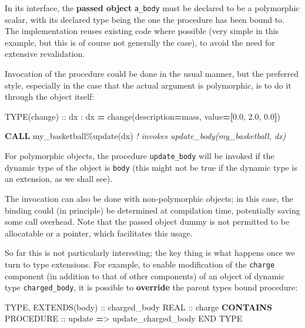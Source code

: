 \documentclass[
]{scrartcl}
\newenvironment{Shaded}{}{}
\newcommand{\CommentTok}[1]{\textcolor[rgb]{0.38,0.63,0.69}{\textit{#1}}}
\newcommand{\DataTypeTok}[1]{\textcolor[rgb]{0.56,0.13,0.00}{#1}}
\newcommand{\FloatTok}[1]{\textcolor[rgb]{0.25,0.63,0.44}{#1}}
\newcommand{\KeywordTok}[1]{\textcolor[rgb]{0.00,0.44,0.13}{\textbf{#1}}}
\newcommand{\NormalTok}[1]{#1}
\newcommand{\OperatorTok}[1]{\textcolor[rgb]{0.40,0.40,0.40}{#1}}
\newcommand{\StringTok}[1]{\textcolor[rgb]{0.25,0.44,0.63}{#1}}
\begin{document}
In its interface, the \textbf{passed object} \texttt{a\_body} must be
declared to be a polymorphic scalar, with its declared type being the
one the procedure has been bound to. The implementation reuses existing
code where possible (very simple in this example, but this is of course
not generally the case), to avoid the need for extensive revalidation.

Invocation of the procedure could be done in the usual manner, but the
preferred style, especially in the case that the actual argument is
polymorphic, is to do it through the object itself:

\begin{Shaded}
\begin{Highlighting}[]
\DataTypeTok{TYPE(change)} \DataTypeTok{::}\NormalTok{  dx}
\NormalTok{:}
\NormalTok{dx }\KeywordTok{=}\NormalTok{ change(description}\KeywordTok{=}\StringTok{\textquotesingle{}mass\textquotesingle{}}\NormalTok{, }\DataTypeTok{value}\KeywordTok{=[}\FloatTok{0.0}\NormalTok{, }\FloatTok{2.0}\NormalTok{, }\FloatTok{0.0}\KeywordTok{]}\NormalTok{)}

\KeywordTok{CALL}\NormalTok{ my\_basketball}\OperatorTok{\%}\NormalTok{update(dx) }\CommentTok{! invokes update\_body(my\_basketball, dx)}
\end{Highlighting}
\end{Shaded}

For polymorphic objects, the procedure \texttt{update\_body} will be
invoked if the dynamic type of the object is \texttt{body} (this might
not be true if the dynamic type is an extension, as we shall see).

The invocation can also be done with non-polymorphic objects; in this
case, the binding could (in principle) be determined at compilation
time, potentially saving some call overhead. Note that the passed object
dummy is not permitted to be allocatable or a pointer, which facilitates
this usage.

So far this is not particularly interesting; the key thing is what
happens once we turn to type extensions. For example, to enable
modification of the \texttt{charge} component (in addition to that of
other components) of an object of dynamic type \texttt{charged\_body},
it is possible to \textbf{override} the parent type\textquotesingle s
bound procedure:

\begin{Shaded}
\begin{Highlighting}[]
\DataTypeTok{TYPE}\NormalTok{, }\DataTypeTok{EXTENDS(body)} \DataTypeTok{::}\NormalTok{ charged\_body}
   \DataTypeTok{REAL} \DataTypeTok{::}\NormalTok{ charge}
\KeywordTok{CONTAINS}
   \DataTypeTok{PROCEDURE} \DataTypeTok{::}\NormalTok{ update }\KeywordTok{=}\OperatorTok{\textgreater{}}\NormalTok{ update\_charged\_body}
\DataTypeTok{END TYPE}
\end{Highlighting}
\end{Shaded}
\end{document}
